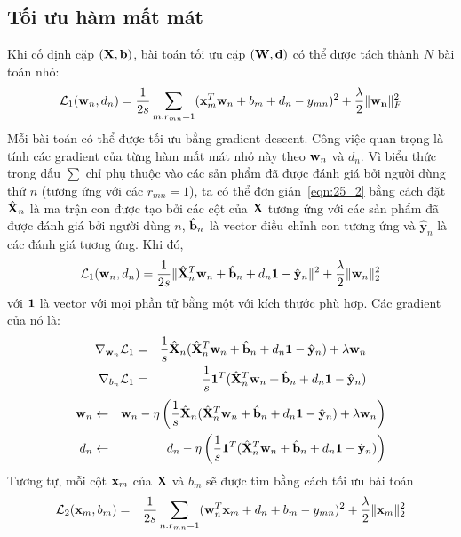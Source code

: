 \subsection{Tối ưu hàm mất mát }
Khi cố định cặp $(\mathbf{X}, \mathbf{b})$, bài toán tối ưu cặp $(\mathbf{W}, \mathbf{d})$ có thể được tách
thành $N$ bài toán nhỏ:
\begin{equation}
\label{eqn:25_2}
\mathcal{L}_1(\mathbf{w}_n, d_n) = \frac{1}{2s} \sum_{m:r_{mn} = 1}
(\mathbf{x}_m^T\mathbf{w}_n + b_m + d_n - y_{mn})^2 + \frac{\lambda}{2}
\|\mathbf{w_n}\|_F^2
\end{equation}
Mỗi bài toán có thể được tối ưu bằng gradient descent. Công việc quan trọng là tính các gradient của từng hàm mất mát nhỏ này theo $\mathbf{w}_n$ và
$d_n$.
Vì biểu thức trong dấu $\sum$ chỉ phụ thuộc vào các sản phẩm đã được đánh
giá bởi người dùng thứ $n$ (tương ứng với các $r_{mn}  = 1$), ta có thể đơn
giản~\eqref{eqn:25_2} bằng cách đặt $\hat{\mathbf{X}}_n$ là ma trận con được tạo bởi
các cột của $\mathbf{X}$ tương ứng với các sản phẩm đã được đánh giá bởi
người dùng $n$, $\hat{\mathbf{b}}_n$ là vector điều chỉnh con tương ứng và
$\hat{\mathbf{y}}_n$ là các đánh giá tương ứng. Khi đó,
\begin{equation}
\mathcal{L}_1(\mathbf{w}_n, d_n) = \frac{1}{2s} \|\hat{\mathbf{X}}^T_n\mathbf{w}_n +
\hat{\mathbf{b}}_n
+ d_n\mathbf{1} - \hat{\mathbf{y}}_n\|^2 + \frac{\lambda}{2}\|\mathbf{w}_n\|_2^2
\end{equation}
với $\mathbf{1}$ là vector với mọi phần tử bằng một với kích thước phù hợp. Các gradient
của nó là:
\begin{eqnarray}
\nabla_{\mathbf{w}_n}\mathcal{L}_1
&=&
\frac{1}{s}\hat{\mathbf{X}}_n(\hat{\mathbf{X}}_n^T\mathbf{w}_n + \hat{\mathbf{b}}_n + d_n\mathbf{1} -
\hat{\mathbf{y}}_n) + \lambda \mathbf{w}_n \\\
\nabla_{b_n}\mathcal{L}_1
&=&
\frac{1}{s}\mathbf{1}^T(\hat{\mathbf{X}}_n^T\mathbf{w}_n + \hat{\mathbf{b}}_n + d_n\mathbf{1} -
\hat{\mathbf{y}}_n)
\end{eqnarray}
\begin{eqnarray}
\mathbf{w}_n &\leftarrow& \mathbf{w}_n - \eta \left(\frac{1}{s}\hat{\mathbf{X}}_n(\hat{\mathbf{X}}_n^T\mathbf{w}_n +
\hat{\mathbf{b}}_n + d_n\mathbf{1} - \hat{\mathbf{y}}_n) + \lambda \mathbf{w}_n\right) \\
d_n &\leftarrow& d_n - \eta \left(\frac{1}{s}\mathbf{1}^T(\hat{\mathbf{X}}_n^T\mathbf{w}_n + \hat{\mathbf{b}}_n + d_n\mathbf{1} -
\hat{\mathbf{y}}_n)\right)
\end{eqnarray}
Tương tự, mỗi cột $\mathbf{x}_m$ của $\mathbf{X}$ và $b_m$ sẽ được tìm bằng cách tối ưu bài toán
\begin{eqnarray}
\label{eqn:25_xm}
\mathcal{L}_2(\mathbf{x}_m, b_m) &=& \frac{1}{2s}\sum_{n:r_{mn} = 1}
(\mathbf{w}_n^T\mathbf{x}_m + d_n  + b_m - y_{mn})^2 + \frac{\lambda}{2}\|\mathbf{x}_m\|_2^2
\end{eqnarray}
